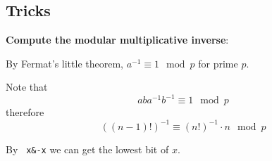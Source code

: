 \documentclass[11pt]{article}
\let\OldTexttt\texttt
\renewcommand{\texttt}[1]{\OldTexttt{\color{MidnightBlue} #1}}
\begin{document}
\subsection{Tricks}
\label{sec:orgc0e64a9}
\textbf{Compute the modular multiplicative inverse}:

By Fermat's little theorem, \(a^{-1}\equiv 1\mod p\) for prime \(p\).

Note that
\begin{equation*}
aba^{-1}b^{-1}\equiv 1\mod p
\end{equation*}
therefore
\begin{equation*}
((n-1)!)^{-1}\equiv(n!)^{-1}\cdot n\mod p
\end{equation*}

By \texttt{x\&-x} we can get the lowest bit of \(x\).
\end{document}
